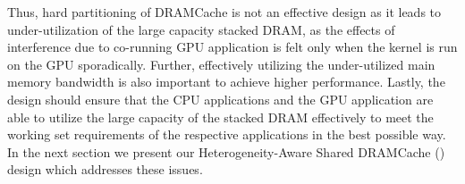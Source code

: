 Thus, hard partitioning of DRAMCache is not an effective design as it leads to under-utilization of the large capacity 
stacked DRAM, as the effects of interference due to co-running GPU application is felt only when the kernel is run on the GPU sporadically.
Further, effectively utilizing the under-utilized main memory bandwidth \cite{micro-refresh, mainak-hpca, bear}
is also important to achieve higher performance.  Lastly, the design should ensure that the CPU applications and the 
GPU application are able to utilize the large capacity of the stacked DRAM effectively to meet the working set 
requirements of the respective applications in the best possible way. In the next section we present our Heterogeneity-Aware Shared DRAMCache (\cachename) design which addresses these issues.
